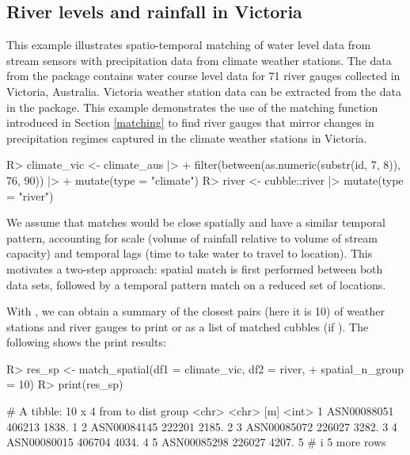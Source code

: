 \documentclass[
  shortnames]{jss}
\begin{document}
\hypertarget{river-levels-and-rainfall-in-victoria}{%
\subsection{River levels and rainfall in Victoria}\label{river-levels-and-rainfall-in-victoria}}

This example illustrates spatio-temporal matching of water level data from stream sensors with precipitation data from climate weather stations. The data  from the  package contains water course level data for 71 river gauges collected in Victoria, Australia. Victoria weather station data can be extracted from the  data in the  package. This example demonstrates the use of the matching function introduced in Section \ref{matching} to find river gauges that mirror changes in precipitation regimes captured in the climate weather stations in Victoria.

\begin{CodeChunk}
\begin{CodeInput}
R> climate_vic <- climate_aus |>
+   filter(between(as.numeric(substr(id, 7, 8)), 76, 90)) |>
+   mutate(type = "climate")
R> river <- cubble::river |> mutate(type = "river") 
\end{CodeInput}
\end{CodeChunk}

We assume that matches would be close spatially and have a similar temporal pattern, accounting for scale (volume of rainfall relative to volume of stream capacity) and temporal lags (time to take water to travel to location). This motivates a two-step approach: spatial match is first performed between both data sets, followed by a temporal pattern match on a reduced set of locations.

With , we can obtain a summary of the closest pairs (here it is 10) of weather stations and river gauges to print or as a list of matched cubbles (if ). The following shows the print results:

\begin{CodeChunk}
\begin{CodeInput}
R> res_sp <- match_spatial(df1 = climate_vic, df2 = river, 
+                         spatial_n_group = 10)
R> print(res_sp)
\end{CodeInput}
\begin{CodeOutput}
# A tibble: 10 x 4
  from        to      dist group
  <chr>       <chr>    [m] <int>
1 ASN00088051 406213 1838.     1
2 ASN00084145 222201 2185.     2
3 ASN00085072 226027 3282.     3
4 ASN00080015 406704 4034.     4
5 ASN00085298 226027 4207.     5
# i 5 more rows
\end{CodeOutput}
\end{CodeChunk}
\end{document}
